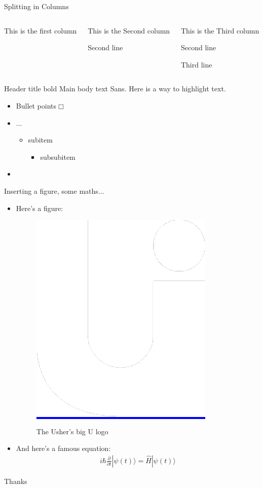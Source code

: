 \documentclass{beamer}
\begin{document}
\begin{frame}[fragile]{Splitting in Columns}
\begin{columns}
\begin{column}{0.3\textwidth}
	This is the first column\par
\end{column}
\begin{column}{0.4\textwidth}
	This is the Second column\par
	Second line\par
\end{column}
\begin{column}{0.3\textwidth}
	This is the Third column\par
	Second line\par
	Third line\par
\end{column}
\end{columns}
\end{frame}

\begin{frame}[t]{Header title bold}
	Main body text Sans. Here is a way to \alert{highlight text}.
	\label{sec:Test1}
	\begin{itemize}
		\item Bullet points$\Box$
		\item ...
			\begin{itemize}
				\item subitem
					\begin{itemize}
						\item subsubitem
					\end{itemize}
			\end{itemize}
		\item \lipsum[2]
	\end{itemize}
\end{frame}



\begin{frame}{Inserting a figure, some maths...}
  \begin{itemize}
  \item   Here's a figure:
    \begin{figure}[h]
      \centering
      \colorbox{blue}{\includegraphics[width=.13\linewidth]{./assets/img/logo}}
      \caption{The Usher's big U logo}
      \label{fig:big-u}
    \end{figure}
  \item 
    And here's a famous equation:
  \begin{eqnarray}
    \label{eq:schroedinger}
    i\hbar {\frac {\partial }{\partial t}}|\psi (t)\rangle ={\hat {H}}|\psi (t)\rangle
  \end{eqnarray}
  \end{itemize}
\end{frame}

\begin{frame}
	\begin{center}
		{\fontsize{50}{60}\selectfont Thanks}
	\end{center}
\end{frame}
\end{document}
